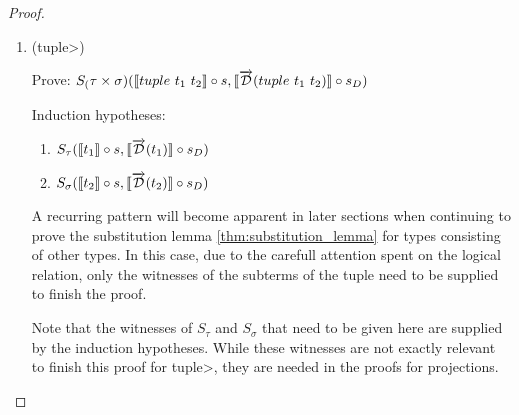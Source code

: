 \documentclass[11pt, final]{article}
\begin{document}
\begin{proof}
\begin{enumerate}
      \item (\<tuple>)

      Prove: $S_(\tau \times \sigma)(\llbracket tuple\ t_1\ t_2 \rrbracket \circ s, \llbracket \overrightarrow{\mathcal{D}}(tuple\ t_1\ t_2) \rrbracket \circ s_D)$

      Induction hypotheses:
      \begin{enumerate}
        \item \label{eqn:subst_ih_tuple1}$S_\tau(\llbracket t_1 \rrbracket \circ s, \llbracket \overrightarrow{\mathcal{D}}(t_1) \rrbracket \circ s_D)$
        \item \label{eqn:subst_ih_tuple2}$S_\sigma(\llbracket t_2 \rrbracket \circ s, \llbracket \overrightarrow{\mathcal{D}}(t_2) \rrbracket \circ s_D)$
      \end{enumerate}

      A recurring pattern will become apparent in later sections when continuing to prove the substitution lemma \ref{thm:substitution_lemma} for types consisting of other types.
      In this case, due to the carefull attention spent on the logical relation, only the witnesses of the subterms of the tuple need to be supplied to finish the proof.

      Note that the witnesses of $S_\tau$ and $S_\sigma$ that need to be given here are supplied by the induction hypotheses.
      While these witnesses are not exactly relevant to finish this proof for \<tuple>, they are needed in the proofs for projections.


\end{enumerate}
\end{proof}
\end{document}
